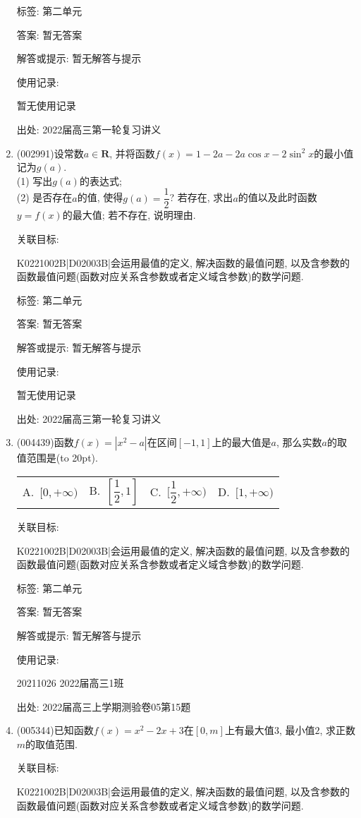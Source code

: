 \documentclass[10pt,a4paper]{article}
\newcommand{\bracket}[1]{(\hbox to #1pt{})}
\newcommand{\fourch}[4]{\par\begin{tabular}{p{.23\textwidth}p{.23\textwidth}p{.23\textwidth}p{.23\textwidth}}
A.~#1 &B.~#2& C.~#3& D.~#4
\end{tabular}}
\begin{document}
\begin{enumerate}[1.]
标签: 第二单元

答案: 暂无答案

解答或提示: 暂无解答与提示

使用记录:

暂无使用记录


出处: 2022届高三第一轮复习讲义
\item { (002991)}设常数$a\in \mathbf{R}$, 并将函数$f(x)=1-2a-2a\cos x-2\sin^2 x$的最小值记为$g(a)$.\\
(1) 写出$g(a)$的表达式;\\
(2) 是否存在$a$的值, 使得$g(a)=\dfrac 12$? 若存在, 求出$a$的值以及此时函数$y=f(x)$的最大值; 若不存在, 说明理由.


关联目标:

K0221002B|D02003B|会运用最值的定义, 解决函数的最值问题, 以及含参数的函数最值问题(函数对应关系含参数或者定义域含参数)的数学问题.



标签: 第二单元

答案: 暂无答案

解答或提示: 暂无解答与提示

使用记录:

暂无使用记录


出处: 2022届高三第一轮复习讲义
\item { (004439)}函数$f(x)=|x^2-a|$在区间$[-1,1]$上的最大值是$a$, 那么实数$a$的取值范围是\bracket{20}.
\fourch{$[0,+\infty)$}{$[\dfrac 12,1]$}{$[\dfrac 12,+\infty)$}{$[1,+\infty)$}


关联目标:

K0221002B|D02003B|会运用最值的定义, 解决函数的最值问题, 以及含参数的函数最值问题(函数对应关系含参数或者定义域含参数)的数学问题.



标签: 第二单元

答案: 暂无答案

解答或提示: 暂无解答与提示

使用记录:

20211026	2022届高三1班	


出处: 2022届高三上学期测验卷05第15题
\item { (005344)}已知函数$f(x)=x^2-2x+3$在$[0,m]$上有最大值$3$, 最小值$2$, 求正数$m$的取值范围.


关联目标:

K0221002B|D02003B|会运用最值的定义, 解决函数的最值问题, 以及含参数的函数最值问题(函数对应关系含参数或者定义域含参数)的数学问题.




\end{enumerate}
\end{document}
